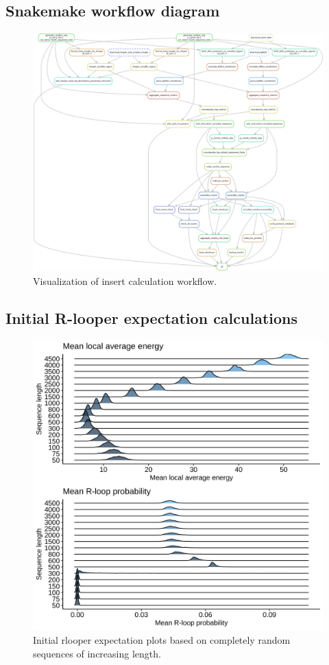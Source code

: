 \documentclass[11pt]{article}
\begin{document}
\subsection{Snakemake workflow diagram}

\begin{figure}[H]
	\includegraphics[width=15cm]{images/misc/dag.png}
	\centering
	\caption{Visualization of insert calculation workflow.}
\end{figure}

\subsection{Initial R-looper expectation calculations}


\begin{figure}[H]
	\includegraphics[width=15cm]{images/plots/rand_seq_LAE_dist.png}
	\centering
	\caption{Initial rlooper expectation plots based on completely random sequences of increasing length.}
\end{figure}


\pagebreak


\end{document}
